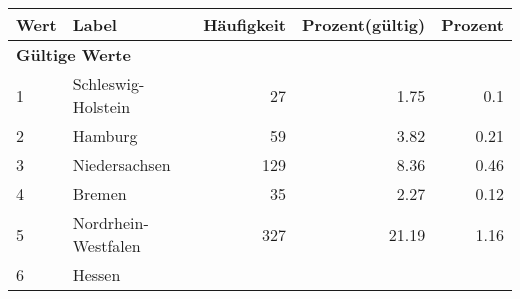      \begin{longtable}{lXrrr}
     \toprule
     \textbf{Wert} & \textbf{Label} & \textbf{Häufigkeit} & \textbf{Prozent(gültig)} & \textbf{Prozent} \\
     \endhead
     \midrule
     \multicolumn{5}{l}{\textbf{Gültige Werte}}\\

     1 &
     \multicolumn{1}{X}{ Schleswig-Holstein   } &


       \num{27} &
       \num[round-mode=places,round-precision=2]{1,75} &
         \num[round-mode=places,round-precision=2]{0,1} \\

     2 &
     \multicolumn{1}{X}{ Hamburg   } &


       \num{59} &
       \num[round-mode=places,round-precision=2]{3,82} &
         \num[round-mode=places,round-precision=2]{0,21} \\

     3 &
     \multicolumn{1}{X}{ Niedersachsen   } &


       \num{129} &
       \num[round-mode=places,round-precision=2]{8,36} &
         \num[round-mode=places,round-precision=2]{0,46} \\

     4 &
     \multicolumn{1}{X}{ Bremen   } &


       \num{35} &
       \num[round-mode=places,round-precision=2]{2,27} &
         \num[round-mode=places,round-precision=2]{0,12} \\

     5 &
     \multicolumn{1}{X}{ Nordrhein-Westfalen   } &


       \num{327} &
       \num[round-mode=places,round-precision=2]{21,19} &
         \num[round-mode=places,round-precision=2]{1,16} \\

     6 &
     \multicolumn{1}{X}{ Hessen   } &



\end{longtable}
